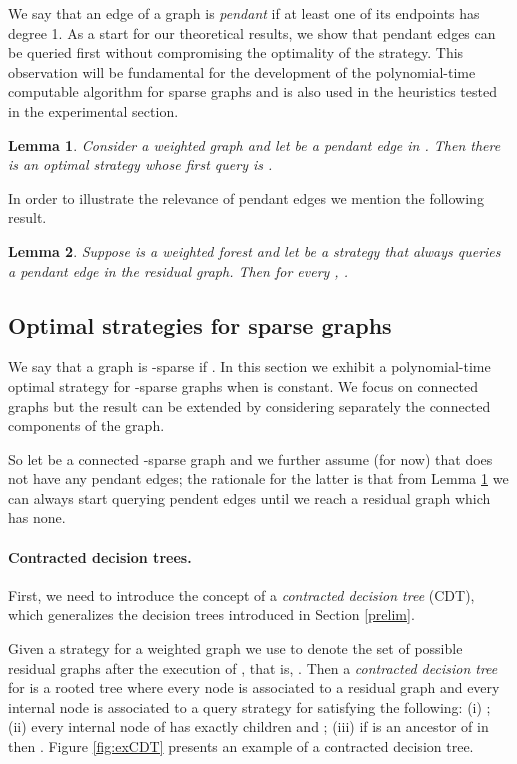 \documentclass[12pt]{article}
\newtheorem{lemma}{Lemma}
\begin{document}
	We say that an edge of a graph is \emph{pendant} if at least one of its endpoints has degree 1. As a start for our theoretical results, we show that pendant edges can be queried first without compromising the optimality of the strategy. This observation will be fundamental for the development of the polynomial-time computable algorithm for sparse graphs and is also used in the heuristics tested in the experimental section. 
		
	\begin{lemma} \label{pendantFirst}
		Consider a weighted graph  and let  be a pendant edge in . Then there is an optimal strategy whose first query is . 
	\end{lemma}
		

	In order to illustrate the relevance of pendant edges we mention the following result.
	
	\begin{lemma}
		Suppose  is a weighted forest and let  be a strategy that always queries a pendant edge in the residual graph. Then for every , .
	\end{lemma}


	\subsection{Optimal strategies for sparse graphs} \label{optSparse}
	
	We say that a graph  is -sparse if . In this section we exhibit a polynomial-time optimal strategy for -sparse graphs when  is constant. We focus on connected graphs but the result can be extended by considering separately the connected components of the graph. 
	
	So let  be a connected -sparse graph and we further assume (for now) that  does not have any pendant edges; the rationale for the latter is that from Lemma \ref{pendantFirst} we can always start querying pendent edges until we reach a residual graph which has none.
	
	\paragraph{Contracted decision trees.} First, we need to introduce the concept of a \emph{contracted decision tree} (CDT), which generalizes the decision trees introduced in Section \ref{prelim}.

	 Given a strategy  for a weighted graph  we use  to denote the set of possible residual graphs after the execution of , that is, . Then a \emph{contracted decision tree}  for  is a rooted tree where every node  is associated to a residual graph  and every internal node  is associated to a query strategy  for  satisfying the following: (i) ; (ii) every internal node  of  has exactly  children  and ; (iii) if  is an ancestor of  in  then . Figure \ref{fig:exCDT} presents an example of a contracted decision tree. 
	 
\end{document}
